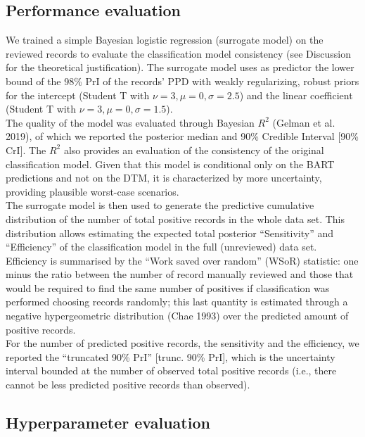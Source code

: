 \documentclass{article}
\begin{document}
\hypertarget{performance-evaluation}{%
\subsection{Performance evaluation}\label{performance-evaluation}}

We trained a simple Bayesian logistic regression (surrogate model) on
the reviewed records to evaluate the classification model consistency
(see Discussion for the theoretical justification). The surrogate model
uses as predictor the lower bound of the 98\% PrI of the records' PPD
with weakly regularizing, robust priors for the intercept (Student T
with \(\nu=3,\mu=0,\sigma=2.5\)) and the linear coefficient (Student T
with \(\nu=3,\mu=0,\sigma=1.5\)).\\
The quality of the model was evaluated through Bayesian \(R^2\) (Gelman
et al. 2019), of which we reported the posterior median and 90\%
Credible Interval {[}90\% CrI{]}. The \(R^2\) also provides an
evaluation of the consistency of the original classification model.
Given that this model is conditional only on the BART predictions and
not on the DTM, it is characterized by more uncertainty, providing
plausible worst-case scenarios.\\
The surrogate model is then used to generate the predictive cumulative
distribution of the number of total positive records in the whole data
set. This distribution allows estimating the expected total posterior
``Sensitivity'' and ``Efficiency'' of the classification model in the
full (unreviewed) data set. Efficiency is summarised by the ``Work saved
over random'' (WSoR) statistic: one minus the ratio between the number
of record manually reviewed and those that would be required to find the
same number of positives if classification was performed choosing
records randomly; this last quantity is estimated through a negative
hypergeometric distribution (Chae 1993) over the predicted amount of
positive records.\\
For the number of predicted positive records, the sensitivity and the
efficiency, we reported the ``truncated 90\% PrI'' {[}trunc. 90\%
PrI{]}, which is the uncertainty interval bounded at the number of
observed total positive records (i.e., there cannot be less predicted
positive records than observed).

\hypertarget{hyperparameter-evaluation}{%
\subsection{Hyperparameter evaluation}\label{hyperparameter-evaluation}}
\end{document}

